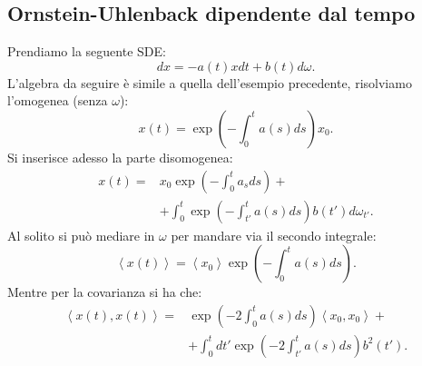 \subsection{Ornstein-Uhlenback dipendente dal tempo}%
\label{sub:Ornstein-Uhlenback dipendente dal tempo}
Prendiamo la seguente SDE:
\[
    dx = -a(t) x dt + b(t) d\omega
.\] 
L'algebra da seguire è simile a quella dell'esempio precedente, risolviamo l'omogenea (senza $\omega$):
\[
    x(t) = \exp\left(-\int_{0}^{t} a(s) ds \right)x_0
.\] 
Si inserisce adesso la parte disomogenea:
\[\begin{aligned}
    x(t) =& x_0 \exp\left(-\int_{0}^{t} a_sds \right) + \\
	  & + \int_{0}^{t} \exp\left(-\int_{t'}^{t} a(s) ds  \right)b(t') d\omega_{t'} 
.\end{aligned}\]
Al solito si può mediare in $\omega$ per mandare via il secondo integrale:
\[
    \left<x(t)\right> = \left<x_0\right> \exp\left(-\int_{0}^{t} a(s) ds \right)
.\] 
Mentre per la covarianza si ha che:
\[\begin{aligned}
    \left<x(t),x(t) \right> = & \exp\left(-2  \int_{0}^{t} a(s) ds \right)\left<x_0,x_0\right> + \\
			      & + \int_{0}^{t} dt'  \exp\left(-2\int_{t'}^{t} a(s) ds \right) b^2(t') 
.\end{aligned}\]
